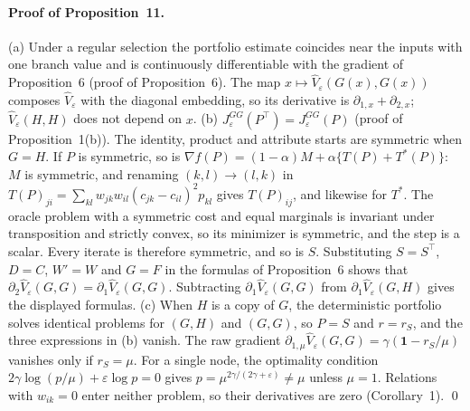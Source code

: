 \documentclass[12pt]{article}
\begin{document}
\paragraph{Proof of Proposition~11.}
(a) Under a regular selection the portfolio estimate coincides near the inputs with one branch value and is continuously differentiable with the gradient of Proposition~6 (proof of Proposition~6). The map $x\mapsto\widehat V_\varepsilon(G(x),G(x))$ composes $\widehat V_\varepsilon$ with the diagonal embedding, so its derivative is $\partial_{1,x}+\partial_{2,x}$; $\widehat V_\varepsilon(H,H)$ does not depend on $x$.
(b) $J^{GG}_\varepsilon(P^\top)=J^{GG}_\varepsilon(P)$ (proof of Proposition~1(b)). The identity, product and attribute starts are symmetric when $G=H$. If $P$ is symmetric, so is $\nabla f(P)=(1-\alpha)M+\alpha\{T(P)+T^\ast(P)\}$: $M$ is symmetric, and renaming $(k,l)\to(l,k)$ in $T(P)_{ji}=\sum_{kl}w_{jk}w_{il}(c_{jk}-c_{il})^2p_{kl}$ gives $T(P)_{ij}$, and likewise for $T^\ast$. The oracle problem with a symmetric cost and equal marginals is invariant under transposition and strictly convex, so its minimizer is symmetric, and the step is a scalar. Every iterate is therefore symmetric, and so is $S$. Substituting $S=S^\top$, $D=C$, $W'=W$ and $G=F$ in the formulas of Proposition~6 shows that $\partial_2\widehat V_\varepsilon(G,G)=\partial_1\widehat V_\varepsilon(G,G)$. Subtracting $\partial_1\widehat V_\varepsilon(G,G)$ from $\partial_1\widehat V_\varepsilon(G,H)$ gives the displayed formulas.
(c) When $H$ is a copy of $G$, the deterministic portfolio solves identical problems for $(G,H)$ and $(G,G)$, so $P=S$ and $r=r_S$, and the three expressions in (b) vanish. The raw gradient $\partial_{1,\mu}\widehat V_\varepsilon(G,G)=\gamma(\mathbf 1-r_S/\mu)$ vanishes only if $r_S=\mu$. For a single node, the optimality condition $2\gamma\log(p/\mu)+\varepsilon\log p=0$ gives $p=\mu^{2\gamma/(2\gamma+\varepsilon)}\neq\mu$ unless $\mu=1$. Relations with $w_{ik}=0$ enter neither problem, so their derivatives are zero (Corollary~1). \qed
\end{document}
